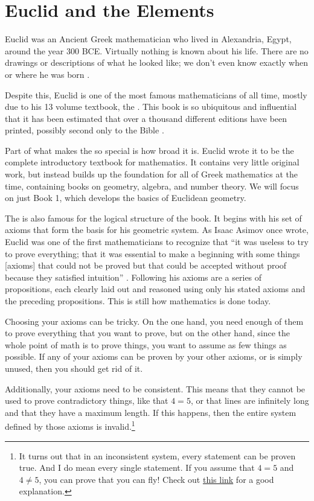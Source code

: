 \documentclass[12pt]{article}
\begin{document}
\section*{Euclid and the Elements}

Euclid was an Ancient Greek mathematician who lived in Alexandria, Egypt, around the year 300 BCE. Virtually nothing is known about his life. There are no drawings or descriptions of what he looked like; we don't even know exactly when or where he was born \cite{euclid,boyer2011history}.

Despite this, Euclid is one of the most famous mathematicians of all time, mostly due to his 13 volume textbook, the \elements. This book is so ubiquitous and influential that it has been estimated that over a thousand different editions have been printed, possibly second only to the Bible \cite{boyer2011history}.

Part of what makes the \elements{} so special is how broad it is. Euclid wrote it to be the complete introductory textbook for mathematics. It contains very little original work, but instead builds up the foundation for all of Greek mathematics at the time, containing books on geometry, algebra, and number theory. We will focus on just Book 1, which develops the basics of Euclidean geometry.

The \elements{} is also famous for the logical structure of the book. It begins with his set of axioms that form the basis for his geometric system. As Isaac Asimov once wrote, Euclid was one of the first mathematicians to recognize that ``it was useless to try to prove everything; that it was essential to make a beginning with some things [axioms] that could not be proved but that could be accepted without proof because they satisfied intuition'' \cite{asimov}. Following his axioms are a series of propositions, each clearly laid out and reasoned using only his stated axioms and the preceding propositions. This is still how mathematics is done today.

Choosing your axioms can be tricky. On the one hand, you need enough of them to prove everything that you want to prove, but on the other hand, since the whole point of math is to prove things, you want to assume as few things as possible. If any of your axioms can be proven by your other axioms, or is simply unused, then you should get rid of it.

Additionally, your axioms need to be consistent. This means that they cannot be used to prove contradictory things, like that $4=5$, or that lines are infinitely long and that they have a maximum length. If this happens, then the entire system defined by those axioms is invalid.\footnote{It turns out that in an inconsistent system, every statement can be proven true. And I do mean every single statement. If you assume that $4=5$ and $4\neq5$, you can prove that you can fly! Check out \href{https://math.stackexchange.com/questions/30437/why-in-an-inconsistent-axiom-system-every-statement-is-true-for-dummies}{this link} for a good explanation.}
\end{document}
